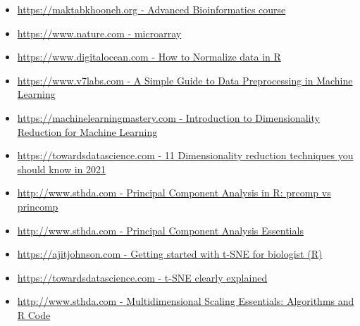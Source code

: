 \documentclass[11pt]{article}
\providecommand{\tightlist}{%
      \setlength{\itemsep}{0pt}\setlength{\parskip}{0pt}}
\begin{document}
\begin{itemize}
\tightlist
\item
  \href{https://maktabkhooneh.org/course/\%D8\%A8\%DB\%8C\%D9\%88\%D8\%A7\%D9\%86\%D9\%81\%D9\%88\%D8\%B1\%D9\%85\%D8\%A7\%D8\%AA\%DB\%8C\%DA\%A9-\%D9\%BE\%DB\%8C\%D8\%B4\%D8\%B1\%D9\%81\%D8\%AA\%D9\%87-mk375/\#seasons}{https://maktabkhooneh.org
  - Advanced Bioinformatics course}
\item
  \href{https://www.nature.com/scitable/definition/microarray-202/}{https://www.nature.com
  - microarray}
\item
  \href{https://www.digitalocean.com/community/tutorials/normalize-data-in-r}{https://www.digitalocean.com
  - How to Normalize data in R}
\item
  \href{https://www.v7labs.com/blog/data-preprocessing-guide}{https://www.v7labs.com
  - A Simple Guide to Data Preprocessing in Machine Learning}
\item
  \href{https://machinelearningmastery.com/dimensionality-reduction-for-machine-learning/}{https://machinelearningmastery.com
  - Introduction to Dimensionality Reduction for Machine Learning}
\item
  \href{https://towardsdatascience.com/11-dimensionality-reduction-techniques-you-should-know-in-2021-dcb9500d388b}{https://towardsdatascience.com
  - 11 Dimensionality reduction techniques you should know in 2021}
\item
  \href{http://www.sthda.com/english/articles/31-principal-component-methods-in-r-practical-guide/118-principal-component-analysis-in-r-prcomp-vs-princomp/}{http://www.sthda.com
  - Principal Component Analysis in R: prcomp vs princomp}
\item
  \href{http://www.sthda.com/english/articles/31-principal-component-methods-in-r-practical-guide/112-pca-principal-component-analysis-essentials/}{http://www.sthda.com
  - Principal Component Analysis Essentials}
\item
  \href{https://ajitjohnson.com/tsne-for-biologist-tutorial/}{https://ajitjohnson.com
  - Getting started with t-SNE for biologist (R)}
\item
  \href{https://towardsdatascience.com/t-sne-clearly-explained-d84c537f53a}{https://towardsdatascience.com
  - t-SNE clearly explained}
\item
  \href{http://www.sthda.com/english/articles/31-principal-component-methods-in-r-practical-guide/122-multidimensional-scaling-essentials-algorithms-and-r-code/}{http://www.sthda.com
  - Multidimensional Scaling Essentials: Algorithms and R Code}

\end{itemize}
\end{document}
